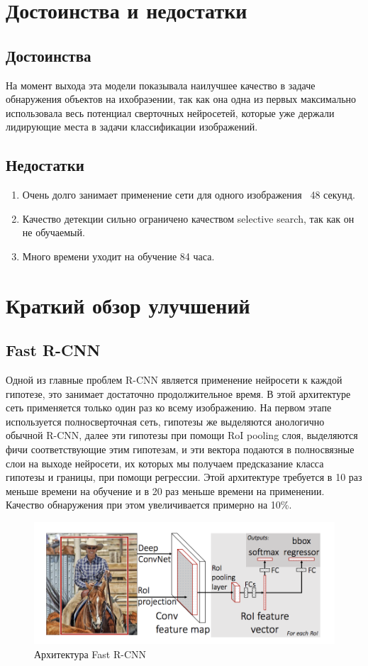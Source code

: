 \documentclass{article}
\begin{document}
	\section{Достоинства и недостатки}
	\subsection{Достоинства}
	На момент выхода эта модели показывала наилучшее качество в задаче обнаружения объектов на ихобраэении, так как она одна из первых максимально использовала весь потенциал сверточных нейросетей, которые уже держали лидирующие места в задачи классификации изображений. 
	\subsection{Недостатки}
	\begin{enumerate}
	    \item Очень долго занимает применение сети для одного изображения ~48 секунд. 
	    \item Качество детекции сильно ограничено качеством selective search, так как он не обучаемый.
	    \item Много времени уходит на обучение 84 часа.
		\end{enumerate}

	\section{Краткий обзор улучшений}
	\subsection{Fast R-CNN}
	Одной из главные проблем R-CNN является применение нейросети к каждой гипотезе, это занимает достаточно продолжительное время. В этой архитектуре сеть применяется только один раз ко всему изображению. На первом этапе используется полносверточная сеть, гипотезы же выделяются анологично обычной R-CNN, далее эти гипотезы при помощи RoI pooling слоя, выделяются фичи соответствующие этим гипотезам, и эти вектора подаются в полносвязные слои на выходе нейросети, их которых мы получаем предсказание класса гипотезы и границы, при помощи регрессии. Этой архитектуре требуется в 10 раз меньше времени на обучение и в 20 раз меньше времени на применении. Качество обнаружения при этом увеличивается примерно на 10\%.
	\begin{figure}[H]
	    \begin{center}
        \includegraphics[width=0.8\linewidth]{Fast.png}
        \caption{Архитектура Fast R-CNN}
        \end{center}
    \end{figure}
	
\end{document}
